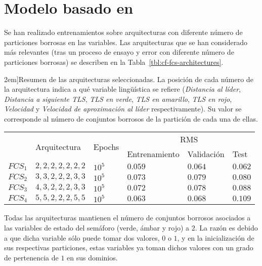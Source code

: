 \section{Modelo basado en }

Se han realizado entrenamientos sobre arquitecturas con diferente número de particiones borrosas en las variables. Las arquitecturas que se han considerado más relevantes (tras un proceso de ensayo y error con diferente número de particiones borrosas) se describen en la Tabla~\ref{tbl:cf-fcs-architectures}. 

\begin{table*}
	\centering
	\caption[Resumen de las arquitecturas \ac{fcs} para el modelo longitudinal][2em]{Resumen de las arquitecturas seleccionadas. La posición de cada número de la arquitectura indica a qué variable lingüística se refiere (\textit{Distancia al líder}, \textit{Distancia a siguiente TLS}, \textit{TLS en verde}, \textit{TLS en amarillo}, \textit{TLS en rojo}, \textit{Velocidad} y \textit{Velocidad de aproximación al líder} respectivamente). Su valor se corresponde al número de conjuntos borrosos de la partición de cada una de ellas.}
	\label{tbl:cf-fcs-architectures}
	\begin{tabularx}{\linewidth}{XXXXXX}
		\toprule
		\multirow{2}{*}{} & \multirow{2}{*}{Arquitectura} & \multirow{2}{*}{Epochs} & \multicolumn{3}{c}{RMS}      \\ 
		& & & Entrenamiento & Validación & Test \\
		\midrule
		\rowcolor{black!20} $FCS_1$ & $2, 2, 2, 2, 2, 2, 2$ & $10^5$ & $0.059$ & $0.064$ & $0.062$  \\
		$FCS_2$ & $3, 3, 2, 2, 2, 3, 3$ & $10^5$ & $0.073$ & $0.079$ & $0.080$  \\
		\rowcolor{black!20} $FCS_3$ & $4, 3, 2, 2, 2, 3, 3$ & $10^5$ & $0.072$ & $0.078$ & $0.088$  \\
		$FCS_4$ & $5, 5, 2, 2, 2, 5, 5$ & $10^5$ & $0.063$ & $0.068$ & $0.109$  \\
		\bottomrule
	\end{tabularx}
\end{table*}

Todas las arquitecturas mantienen el número de conjuntos borrosos asociados a las variables de estado del semáforo (verde, ámbar y rojo) a $2$. La razón es debido a que dicha variable sólo puede tomar dos valores, $0$ o $1$, y en la inicialización de sus respectivas particiones, estas variables ya toman dichos valores con un grado de pertenencia de $1$ en sus dominios.

